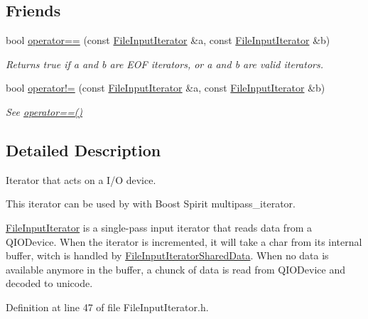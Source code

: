 \subsection*{Friends}
\begin{DoxyCompactItemize}
\item 
bool \hyperlink{struct_mdt_1_1_plain_text_1_1_file_input_iterator_a0728389e31ef4f52e51a7725f31cdf52}{operator==} (const \hyperlink{struct_mdt_1_1_plain_text_1_1_file_input_iterator}{File\+Input\+Iterator} \&a, const \hyperlink{struct_mdt_1_1_plain_text_1_1_file_input_iterator}{File\+Input\+Iterator} \&b)
\begin{DoxyCompactList}\small\item\em Returns true if a and b are E\+OF iterators, or a and b are valid iterators. \end{DoxyCompactList}\item 
bool \hyperlink{struct_mdt_1_1_plain_text_1_1_file_input_iterator_a72b46be4d1041d39fd539fda1124eb45}{operator!=} (const \hyperlink{struct_mdt_1_1_plain_text_1_1_file_input_iterator}{File\+Input\+Iterator} \&a, const \hyperlink{struct_mdt_1_1_plain_text_1_1_file_input_iterator}{File\+Input\+Iterator} \&b)
\begin{DoxyCompactList}\small\item\em See \hyperlink{struct_mdt_1_1_plain_text_1_1_file_input_iterator_a0728389e31ef4f52e51a7725f31cdf52}{operator==()} \end{DoxyCompactList}\end{DoxyCompactItemize}


\subsection{Detailed Description}
Iterator that acts on a I/O device. 

This iterator can be used by with Boost Spirit multipass\+\_\+iterator.

\hyperlink{struct_mdt_1_1_plain_text_1_1_file_input_iterator}{File\+Input\+Iterator} is a single-\/pass input iterator that reads data from a Q\+I\+O\+Device. When the iterator is incremented, it will take a char from its internal buffer, witch is handled by \hyperlink{class_mdt_1_1_plain_text_1_1_file_input_iterator_shared_data}{File\+Input\+Iterator\+Shared\+Data}. When no data is available anymore in the buffer, a chunck of data is read from Q\+I\+O\+Device and decoded to unicode. 

Definition at line 47 of file File\+Input\+Iterator.\+h.



